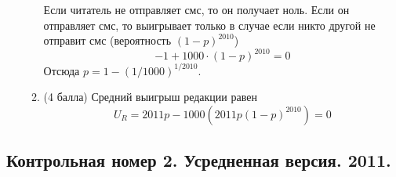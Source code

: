 \documentclass[pdftex,12pt,a4paper]{article}
\begin{document}
\begin{enumerate}
\begin{enumerate}
Если читатель не отправляет смс, то он получает ноль. Если он отправляет смс, то выигрывает только в случае если никто другой не отправит смс (вероятность $(1-p)^{2010}$) 
\begin{equation}
\label{eq_foc}
-1+1000\cdot (1-p)^{2010}=0
\end{equation}
Отсюда $p=1-(1/1000)^{1/2010}$.

\item (4 балла) Средний выигрыш редакции равен
\begin{equation}
U_{R}=2011p-1000(2011p(1-p)^{2010})=0
\end{equation}
\end{enumerate}


\end{enumerate}

\subsection{Контрольная номер 2. Усредненная версия. 2011.} 
\end{document}
